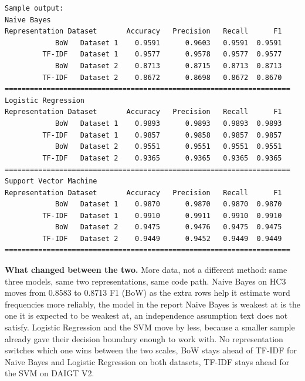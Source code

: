 \documentclass[11pt]{article}
\begin{document}
\vspace{4pt}
\begin{lstlisting}
Sample output:
Naive Bayes
Representation Dataset       Accuracy   Precision   Recall      F1
            BoW   Dataset 1    0.9591      0.9603   0.9591  0.9591
         TF-IDF   Dataset 1    0.9577      0.9578   0.9577  0.9577
            BoW   Dataset 2    0.8713      0.8715   0.8713  0.8713
         TF-IDF   Dataset 2    0.8672      0.8698   0.8672  0.8670
====================================================================
Logistic Regression
Representation Dataset       Accuracy   Precision   Recall      F1
            BoW   Dataset 1    0.9893      0.9893   0.9893  0.9893
         TF-IDF   Dataset 1    0.9857      0.9858   0.9857  0.9857
            BoW   Dataset 2    0.9551      0.9551   0.9551  0.9551
         TF-IDF   Dataset 2    0.9365      0.9365   0.9365  0.9365
====================================================================
Support Vector Machine
Representation Dataset       Accuracy   Precision   Recall      F1
            BoW   Dataset 1    0.9870      0.9870   0.9870  0.9870
         TF-IDF   Dataset 1    0.9910      0.9911   0.9910  0.9910
            BoW   Dataset 2    0.9475      0.9476   0.9475  0.9475
         TF-IDF   Dataset 2    0.9449      0.9452   0.9449  0.9449
====================================================================
\end{lstlisting}

\vspace{10pt}
\noindent\textbf{What changed between the two.} More data, not a different method:
same three models, same two representations, same code path. Naive Bayes on HC3 moves
from 0.8583 to 0.8713 F1 (BoW) as the extra rows help it estimate word frequencies more
reliably, the model in the report Naive Bayes is weakest at is the one it is expected to
be weakest at, an independence assumption text does not satisfy. Logistic Regression and
the SVM move by less, because a smaller sample already gave their decision boundary
enough to work with. No representation switches which one wins between the two scales,
BoW stays ahead of TF-IDF for Naive Bayes and Logistic Regression on both datasets, TF-IDF
stays ahead for the SVM on DAIGT V2.
\end{document}
